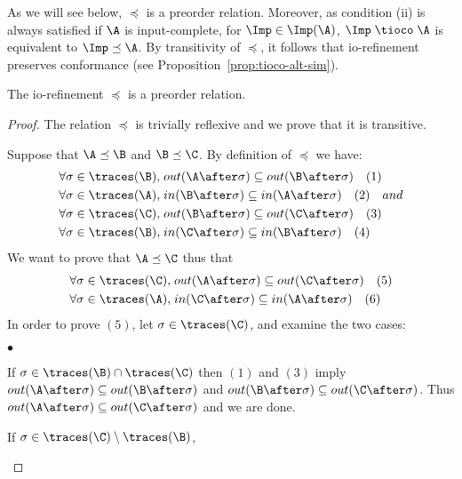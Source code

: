 \documentclass{LMCS}
\theoremstyle{plain}\newtheorem{proposition}[thm]{Proposition}
\begin{document}
As we will see below, $\preceq$ is a preorder relation.  
Moreover, as condition (ii)
is always satisfied if $\A$ is input-complete, for $\Imp \in
\Imp(\A)$, $\Imp \; \tioco\; \A$ is equivalent to $\Imp \preceq \A$.
By transitivity of $\preceq$, it follows that io-refinement preserves
conformance (see Proposition~\ref{prop:tioco-alt-sim}).

\begin{lem}
The io-refinement $\preceq$ is a preorder relation.
\end{lem}
\begin{proof}
The relation $\preceq$ is trivially reflexive and we prove that it is transitive.

Suppose that $\A \preceq \B$ and $\B \preceq \C$.
By definition of $\preceq$ we have:
\begin{equation*}
\begin{aligned}
\forall \sigma \in \traces(\B), \; & out(\A \after  \sigma)  \subseteq out(\B  \after \sigma) \quad (1)\\
\forall \sigma \in \traces(\A), \; & in(\B  \after  \sigma)  \subseteq in(\A  \after  \sigma) \quad (2)  \quad and \\
\forall \sigma \in \traces(\C), \; & out(\B \after  \sigma)  \subseteq out(\C  \after \sigma) \quad (3)\\
\forall \sigma \in \traces(\B), \; & in(\C  \after  \sigma)  \subseteq in(\B  \after  \sigma) \quad (4)
\end{aligned}
\end{equation*}
We want to prove that $\A \preceq \C$ thus that
\begin{equation*}
\begin{aligned}
\forall \sigma \in \traces(\C), \; & out(\A \after  \sigma)  \subseteq out(\C  \after \sigma) \quad (5) \\
\forall \sigma \in \traces(\A), \; & in(\C  \after  \sigma)  \subseteq in(\A  \after  \sigma) \quad (6)
\end{aligned}
\end{equation*}
In order to  prove $(5)$, 
let $\sigma \in \traces(\C)$, and examine the two cases: 
\begin{iteMize}{$\bullet$}
\item If $\sigma \in \traces(\B) \cap \traces(\C) $ then $(1)$ and $(3)$ 
imply    $out(\A \after  \sigma)  \subseteq out(\B  \after \sigma)$ and 
$out(\B  \after \sigma) \subseteq out(\C  \after \sigma)$. Thus 
$out(\A  \after \sigma) \subseteq out(\C  \after \sigma)$ and we are done.
\item If $\sigma \in \traces(\C)\setminus \traces(\B)$, 

\end{iteMize}
\end{proof}
\end{document}
